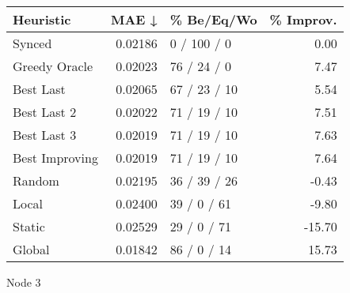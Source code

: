 \begin{tabular}{lrlr}
\toprule
\textbf{Heuristic} & \textbf{MAE ↓} & \textbf{\% Be/Eq/Wo} & \textbf{\% Improv.} \\
\midrule
            Synced &        0.02186 &          0 / 100 / 0 &                0.00 \\
     Greedy Oracle &        0.02023 &          76 / 24 / 0 &                7.47 \\
         Best Last &        0.02065 &         67 / 23 / 10 &                5.54 \\
       Best Last 2 &        0.02022 &         71 / 19 / 10 &                7.51 \\
       Best Last 3 &        0.02019 &         71 / 19 / 10 &                7.63 \\
    Best Improving &        0.02019 &         71 / 19 / 10 &                7.64 \\
            Random &        0.02195 &         36 / 39 / 26 &               -0.43 \\
             Local &        0.02400 &          39 / 0 / 61 &               -9.80 \\
            Static &        0.02529 &          29 / 0 / 71 &              -15.70 \\
            Global &        0.01842 &          86 / 0 / 14 &               15.73 \\
\bottomrule
\end{tabular}
\caption{Node 3}
\label{tab:iid_lr05_le2_bs4_3}

